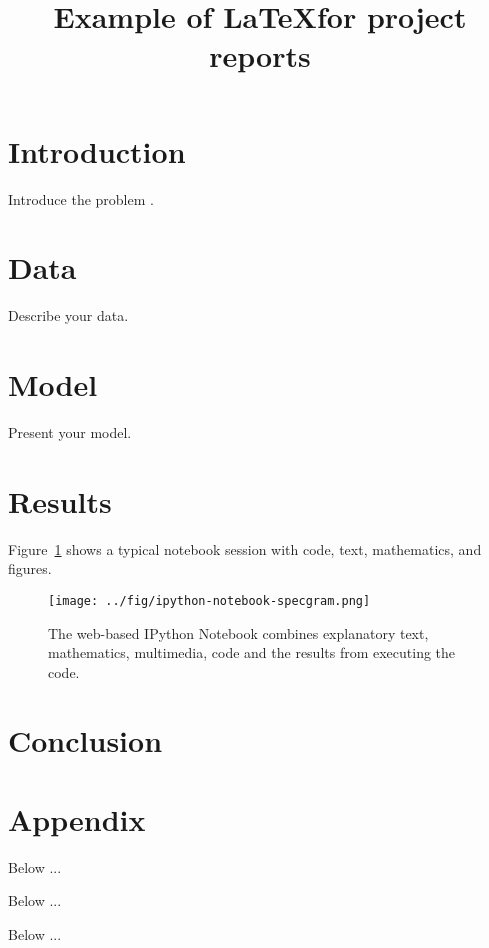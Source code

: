 \documentclass{article}
\begin{document}
\title{Example of \LaTeX for project reports}
\maketitle
\thispagestyle{fancy}

\begin{abstract}
\lipsum[1]
\end{abstract}

\section{Introduction}

Introduce the problem \cite{boswell2011art}.
\lipsum[1]

\section{Data}

Describe your data.
\lipsum[1]

\section{Model}

Present your model.
\lipsum[1]

\section{Results}

Figure~\ref{fig:IPython-notebook} shows a typical notebook session with code,
text, mathematics, and figures.

\begin{figure}
  \begin{centering}
    \texttt{[image: ../fig/ipython-notebook-specgram.png]}\par
  \end{centering}

  \caption{\label{fig:IPython-notebook}The web-based IPython Notebook combines
    explanatory text, mathematics, multimedia, code and the results from
    executing the code.}
\end{figure}

\section{Conclusion}

\lipsum[1]




\clearpage
\appendix

\section*{Appendix}

Below ...


Below ...


Below ...

\end{document}

